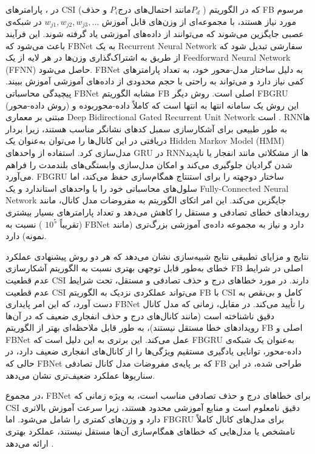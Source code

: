    در 
،
  پارامترهای CSI (مانند احتمال‌های درج
​$P_i$
و حذف 
​$P_d$
) که در الگوریتم FB مرسوم مورد نیاز هستند، با مجموعه‌ای از وزن‌های قابل آموزش
 ${w_{j1}, w_{j2}, w_{j3}, …} $
	در شبکه‌ی عصبی جایگزین می‌شوند که می‌توانند از داده‌های آموزشی یاد گرفته شوند. این فرآیند باعث می‌شود که FBNet به یک 
\gls{Recurrent Neural Network}
	سفارشی تبدیل شود که از طریق به اشتراک‌گذاری وزن‌ها در هر لایه از یک 
\gls{Feedforward Neural Network}
	(FFNN) 
	حاصل می‌شود. FBNet به دلیل ساختار مدل-محور خود، به تعداد پارامترهای کمی نیاز دارد و می‌تواند به راحتی با حجم محدودی از داده‌های آموزشی آموزش ببیند. پیچیدگی محاسباتی FBNet مشابه الگوریتم FB اصلی است.
روش دیگر FBGRU (روش داده-محور) این روش یک سامانه انتها به انتها است که کاملاً داده-محوربوده و مبتنی بر معماری 
\gls{Deep Bidirectional Gated Recurrent Unit Network}
است . 
\gls{RNN}‌ها
 به طور طبیعی برای آشکارسازی سمبل کدهای نشانگر مناسب هستند، زیرا بردار دریافتی در این کانال‌ها را می‌توان به‌عنوان یک 
\gls{Hidden Markov Model}
 (HMM)
  مدل‌سازی کرد. استفاده از واحدهای GRU در 
\gls{RNN}ها
   از مشکلاتی مانند انفجار یا ناپدید شدن گرادیان جلوگیری می‌کند و امکان مدل‌سازی وابستگی‌های بلندمدت را فراهم می‌آورد. FBGRU ساختار دوجهته را برای استنتاج همگام‌سازی حفظ می‌کند، اما سلول‌های محاسباتی خود را با واحدهای استاندارد 
    و یک
\gls{Fully-Connected Neural Network}
     جایگزین می‌کند. این امر اتکای الگوریتم به مفروضات مدل کانال، مانند رویدادهای خطای تصادفی و مستقل را کاهش می‌دهد و تعداد پارامترهای بسیار بیشتری (تقریباً  
$10^5$
) نسبت به FBNet دارد و نیاز به مجموعه داده‌ی آموزشی بزرگ‌تری (مانند 
 نمونه) دارد.

نتایج و مزایای تطبیقی نتایج شبیه‌سازی نشان می‌دهد که هر دو روش پیشنهادی عملکرد خطای به‌طور قابل توجهی بهتری نسبت به الگوریتم آشکارسازی FB اصلی در شرایط عدم قطعیت CSI دارند. در مورد خطاهای درج و حذف تصادفی و مستقل، 
 تحت شرایط عدم قطعیت CSI می‌تواند عملکردی نزدیک به الگوریتم FB با CSI کامل و بی‌نقص به دست آورد، که این امر پایداری FBNet را تأیید می‌کند. در مقابل، زمانی که مدل کانال دقیق ناشناخته است (مانند کانال‌های درج و حذف انفجاری ضعیف که در آن‌ها رویدادهای خطا مستقل نیستند)، 
  به طور قابل ملاحظه‌ای بهتر از الگوریتم FB اصلی و FBNet عمل می‌کند. این برتری به این دلیل است که FBGRU به‌عنوان یک شبکه‌ی داده-محور، توانایی یادگیری مستقیم ویژگی‌ها را از کانال‌های انفجاری ضعیف دارد، در حالی که FBNet که بر پایه‌ی مفروضات مدل کانال تصادفی FB طراحی شده، در این سناریوها عملکرد ضعیف‌تری نشان می‌دهد.
  
در مجموع، FBNet برای خطاهای درج و حذف تصادفی مناسب است، به ویژه زمانی که CSI دقیق نامعلوم است و منابع آموزشی محدود هستند، زیرا سرعت آموزش بالاتری دارد و وزن‌های کمتری را شامل می‌شود. اما FBGRU برای مدل‌های کانال کاملاً نامشخص یا مدل‌هایی که خطاهای همگام‌سازی آن‌ها مستقل نیستند، عملکرد بهتری ارائه می‌دهد
\cite{DeepLearningBased}.

